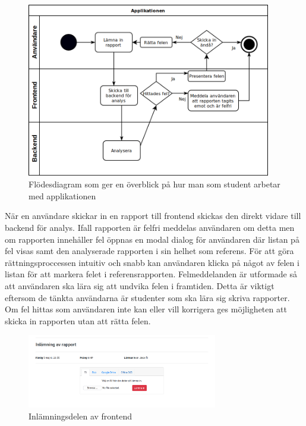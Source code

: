 \documentclass[swedish]{maucsthesis}
\begin{document}
\begin{figure}[H]
    \centering
    \includegraphics[width=0.95\textwidth]{overviewflow.png}
    \caption{Flödesdiagram som ger en överblick på hur man som student arbetar
      med applikationen}
    \label{fig:overviewflow}
\end{figure}

När en användare skickar in en rapport till frontend skickas den direkt vidare
till backend för analys. Ifall rapporten är felfri meddelas användaren om detta
men om rapporten innehåller fel öppnas en modal dialog för användaren där listan
på fel visas samt den analyserade rapporten i sin helhet som referens. För att
göra rättningsproccessen intuitiv och snabb kan användaren klicka på något av
felen i listan för att markera felet i referensrapporten. Felmeddelanden är
utformade så att användaren ska lära sig att undvika felen i framtiden. Detta är
viktigt eftersom de tänkta användarna är studenter som ska lära sig skriva
rapporter. Om fel hittas som användaren inte
kan eller vill korrigera ges möjligheten att skicka in rapporten utan att rätta
felen.

\begin{figure}[H]
    \centering
    \includegraphics[width=0.74\textwidth]{frontendstart.png}
    \caption{Inlämningsdelen av frontend}
    \label{fig:frontendstart}
\end{figure}
\end{document}
